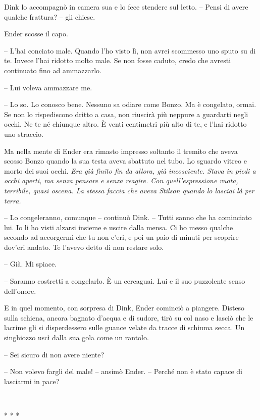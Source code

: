 {Dink lo accompagnò in camera sua e lo fece stendere sul letto. -- Pensi
	di avere qualche frattura? -- gli chiese.}

{Ender scosse il capo.}

{-- L'hai conciato male. Quando l'ho visto lì, non avrei scommesso uno
	sputo su di te. Invece l'hai ridotto molto male. Se non fosse caduto,
	credo che avresti continuato fino ad ammazzarlo.}

{-- Lui voleva ammazzare me.}

{-- Lo so. Lo conosco bene. Nessuno sa odiare come Bonzo. Ma è
	congelato, ormai. Se non lo rispediscono dritto a casa, non riuscirà più
	neppure a guardarti negli occhi. Ne te né chiunque altro. È venti
	centimetri più alto di te, e l'hai ridotto uno straccio.}

{Ma nella mente di Ender era rimasto impresso soltanto il tremito che
	aveva scosso Bonzo quando la sua testa aveva sbattuto nel tubo. Lo
	sguardo vitreo e morto dei suoi occhi. \emph{Era già finito fin da
		allora, già incosciente. Stava in piedi a occhi aperti, ma senza pensare
		e senza reagire. Con quell'espressione vuota, terribile, quasi oscena.
		La stessa faccia che aveva Stilson quando lo lasciai là per terra.}}

{-- Lo congeleranno, comunque -- continuò Dink. -- Tutti sanno che ha
	cominciato lui. Io li ho visti alzarsi insieme e uscire dalla mensa. Ci
	ho messo qualche secondo ad accorgermi che tu non c'eri, e poi un paio
	di minuti per scoprire dov'eri andato. Te l'avevo detto di non restare
	solo.}

{-- Già. Mi spiace.}

{-- Saranno costretti a congelarlo. È un cercaguai. Lui e il suo
	puzzolente senso dell'onore.}

{E in quel momento, con sorpresa di Dink, Ender cominciò a piangere.
	Disteso sulla schiena, ancora bagnato d'acqua e di sudore, tirò su col
	naso e lasciò che le lacrime gli si disperdessero sulle guance velate da
	tracce di schiuma secca. Un singhiozzo uscì dalla sua gola come un
	rantolo.}

{-- Sei sicuro di non avere niente?}

{-- Non volevo fargli del male! -- ansimò Ender. -- Perché non è stato
	capace di lasciarmi in pace?}

{~}

\begin{center}
	{* * *}
\end{center}

{~}

